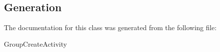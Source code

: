 \subsection{Generation}
The documentation for this class was generated from the following file\-:
\begin{DoxyCompactItemize}
\item GroupCreateActivity
\end{DoxyCompactItemize} 










